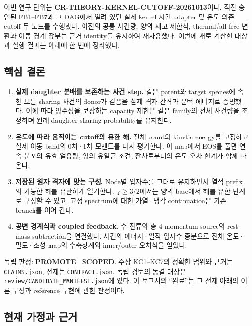 \documentclass[11pt,a4paper]{article}
\providecommand{\tightlist}{\setlength{\itemsep}{2pt}\setlength{\parskip}{0pt}}
\begin{document}
이번 연구 단위는 \textbf{CR-THEORY-KERNEL-CUTOFF-20261013}이다. 직전 승인된 FB1--FB7과 그 DAG에서 열려 있던 실제 kernel 사건 adapter 및 온도 의존 cutoff 두 노드를 수행했다. 이전의 공통 사건량, 양의 재고 제한식, thermal/all-free 변환과 이동 경계 장부는 근거 identity를 유지하여 재사용했다. 이번에 새로 계산한 대상과 실행 결과는 아래에 한 번에 정리했다.

\hypertarget{uxd575uxc2ec-uxacb0uxb860}{%
\subsection{핵심 결론}\label{uxd575uxc2ec-uxacb0uxb860}}

\begin{enumerate}
\def\labelenumi{\arabic{enumi}.}
\tightlist
\item
  \textbf{실제 daughter 분배를 보존하는 사건 step.} 같은 parent와 target species에 속한 모든 sharing 사건의 donor가 같음을 실제 격자 간격과 문턱 에너지로 증명했다. 이에 따라 양수성을 보장하는 capacity 제한은 같은 family의 전체 사건량을 조정하며 원래 daughter sharing probability를 유지한다.
\item
  \textbf{온도에 따라 움직이는 cutoff의 유한 해.} 전체 count와 kinetic energy를 고정하고 실제 이동 band의 0차·1차 모멘트를 다시 평가한다. 이 map에서 EOS를 풀면 연속 분포의 유효 열용량, 양의 유일근 조건, 잔차로부터의 온도 오차 한계가 함께 나온다.
\item
  \textbf{저장된 원자 격자에 맞는 구성.} Node별 입자수를 그대로 유지하면서 열적 prefix의 가능한 해를 유한하게 열거한다. \(\chi\ge3/2\)에서는 양의 base에서 해를 유한 단계로 구성할 수 있고, 고정 spectrum에 대한 가열·냉각 continuation은 기존 branch를 이어 간다.
\item
  \textbf{공변 경계식과 coupled feedback.} 수 전류와 총 4-momentum source의 rest-mass subtraction을 연결했다. 사건의 에너지·열적 입자수 증분으로 전체 온도·밀도·조성 map의 수축상계와 inner/outer 오차식을 얻었다.
\end{enumerate}

독립 판정: \textbf{PROMOTE\_SCOPED}. 주장 KC1--KC7의 정확한 범위와 근거는 \texttt{CLAIMS.json}, 전제는 \texttt{CONTRACT.json}, 독립 검토의 동결 대상은 \nolinkurl{review/CANDIDATE_MANIFEST.json}에 있다. 이 보고서의 ``완료''는 그 전제 아래의 이론 구성과 reference 구현에 관한 판정이다.

\hypertarget{uxd604uxc7ac-uxac00uxc815uxacfc-uxadfcuxac70}{%
\subsection{현재 가정과 근거}\label{uxd604uxc7ac-uxac00uxc815uxacfc-uxadfcuxac70}}
\end{document}

